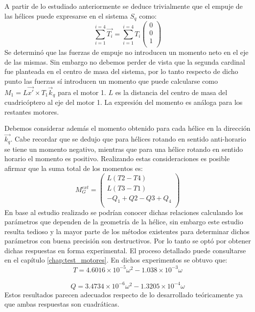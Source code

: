 \documentclass[main]{subfiles}
\begin{document}
A partir de lo estudiado anteriormente se deduce trivialmente que el empuje de las h\'elices puede expresarse en el sistema $S_q$ como:
\begin{equation}
\sum_{i=1}^{i=4} \vec{T_i} =\sum_{i=1}^{i=4}T_i\left(\begin{array}{c}
0\\
0\\
1\\
\end{array} \right)
\end{equation}
Se determin\'o que las fuerzas de empuje no introducen un momento neto en el eje de las mismas. Sin embargo no debemos perder de vista que la segunda cardinal fue planteada en el centro de masa del sistema, por lo tanto respecto de dicho punto las fuerzas s\'i introducen un momento que puede calcularse como $M_1=L\vec{x\prime} \times T_1\vec{k}_q$ para el motor 1. $L$ es la distancia del centro de masa del cuadric\'optero al eje del motor 1. La expresi\'on del momento es an\'aloga para los restantes motores.

Debemos considerar adem\'as el momento obtenido para cada h\'elice en la direcci\'on $\vec{k_q}$. Cabe recordar que se dedujo que para h\'elices rotando en sentido anti-horario se tiene un momento negativo, mientras que para una h\'elice rotando en sentido horario el momento es positivo. Realizando estas consideraciones es posible afirmar que la suma total de los momentos es:
\begin{equation}
M_G^{ext} = \left(\begin{array}{c}
L(T2-T4)\\
L(T3-T1)\\
-Q_1+Q2-Q3+Q_4\\
\end{array} \right)
\end{equation}
En base al estudio realizado se podr\'ian conocer dichas relaciones calculando los par\'ametros que dependen de la geometr\'ia de la h\'elice, sin embargo este estudio resulta tedioso y la mayor parte de los m\'etodos existentes para determinar dichos par\'ametros con buena precisi\'on son destructivos. Por lo tanto se opt\'o por obtener dichas respuestas en forma experimental. El proceso detallado puede consultarse en el cap\'itulo \ref{chap:test_motores}. En dichos experimentos se obtuvo que:
\begin{equation}
T=4.6016\times 10^{-5}\omega^2-1.038\times 10^{-3}\omega
\end{equation}\\
\begin{equation}
Q= 3.4734\times 10^{-6}\omega^2-1.3205\times 10^{-4}\omega 
\end{equation}
Estos resultados parecen adecuados respecto de lo desarrollado te\'oricamente ya que ambas respuestas son cuadr\'aticas. 
\end{document}
